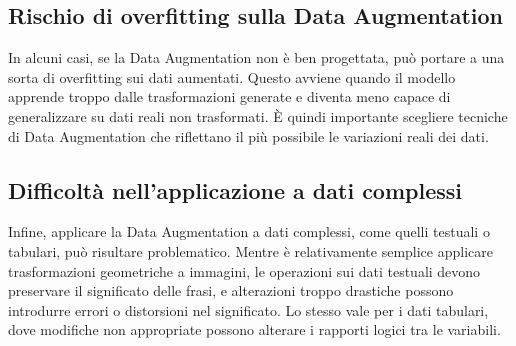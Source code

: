 \subsection{Rischio di overfitting sulla Data Augmentation}

In alcuni casi, se la Data Augmentation non è ben progettata, può portare a una sorta di overfitting sui dati aumentati. Questo avviene quando il modello apprende troppo dalle trasformazioni generate e diventa meno capace di generalizzare su dati reali non trasformati. È quindi importante scegliere tecniche di Data Augmentation che riflettano il più possibile le variazioni reali dei dati.

\subsection{Difficoltà nell’applicazione a dati complessi}

Infine, applicare la Data Augmentation a dati complessi, come quelli testuali o tabulari, può risultare problematico. Mentre è relativamente semplice applicare trasformazioni geometriche a immagini, le operazioni sui dati testuali devono preservare il significato delle frasi, e alterazioni troppo drastiche possono introdurre errori o distorsioni nel significato. Lo stesso vale per i dati tabulari, dove modifiche non appropriate possono alterare i rapporti logici tra le variabili. \cite{consDataAugmentation}
